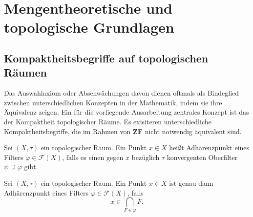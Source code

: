 \chapter{Mengentheoretische und topologische Grundlagen}



\section{Kompaktheitsbegriffe auf topologischen Räumen}

Das Auswahlaxiom oder Abschwächungen davon dienen oftmals als Bindeglied zwischen unterschiedlichen Konzepten in der Mathematik, indem sie ihre Äquivalenz zeigen. 
Ein für die vorliegende Ausarbeitung zentrales Konzept ist das der Kompaktheit topologischer Räume. 
Es exisiteren unterschiedliche Kompaktheitsbegriffe, die im Rahmen von \textbf{ZF} nicht notwendig äquivalent sind.

\begin{defn}
  Sei $(X,\tau)$ ein topologischer Raum.
  Ein Punkt $x \in X$ heißt Adhärenzpunkt eines Filters $\varphi \in \mathcal{F}(X)$, falls es einen gegen $x$ bezüglich $\tau$ konvergenten Oberfilter $\psi \supseteq \varphi$ gibt.
\end{defn}

\begin{prop}
  \label{prop:adherence}
  Sei $(X,\tau)$ ein topologischer Raum.
  Ein Punkt $x \in X$ ist genau dann Adhärenzpunkt eines Filters $\varphi \in \mathcal{F}(X)$, falls
  \begin{displaymath}
    x \in \bigcap_{F \in \varphi} \overline{F}.
  \end{displaymath}
\end{prop}

